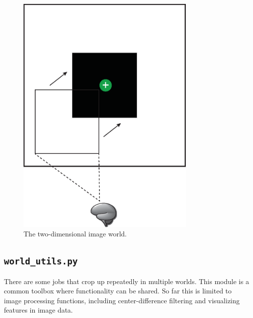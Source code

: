 \begin{figure}
\centering
\includegraphics[height=12cm]{figs/image_world_2D.eps}
\caption{The two-dimensional image world.}
\label{image_2D}
\end{figure}

\subsection{\texttt{world\_utils.py}}

There are some jobs that crop up repeatedly in multiple worlds. This module is a common toolbox where functionality can be shared. So far this is limited to image processing functions, including center-difference filtering and visualizing features in image data.

